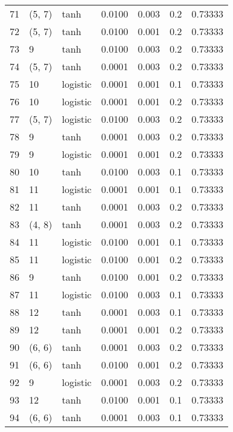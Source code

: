 \begin{tabular}{lllrrrr}
71  &      (5, 7) &      tanh &  0.0100 &  0.003 &  0.2 &   0.73333 \\
72  &      (5, 7) &      tanh &  0.0100 &  0.001 &  0.2 &   0.73333 \\
73  &           9 &      tanh &  0.0100 &  0.003 &  0.2 &   0.73333 \\
74  &      (5, 7) &      tanh &  0.0001 &  0.003 &  0.2 &   0.73333 \\
75  &          10 &  logistic &  0.0001 &  0.001 &  0.1 &   0.73333 \\
76  &          10 &  logistic &  0.0001 &  0.001 &  0.2 &   0.73333 \\
77  &      (5, 7) &  logistic &  0.0100 &  0.003 &  0.2 &   0.73333 \\
78  &           9 &      tanh &  0.0001 &  0.003 &  0.2 &   0.73333 \\
79  &           9 &  logistic &  0.0001 &  0.001 &  0.2 &   0.73333 \\
80  &          10 &      tanh &  0.0100 &  0.003 &  0.1 &   0.73333 \\
81  &          11 &  logistic &  0.0001 &  0.001 &  0.1 &   0.73333 \\
82  &          11 &      tanh &  0.0001 &  0.003 &  0.2 &   0.73333 \\
83  &      (4, 8) &      tanh &  0.0001 &  0.003 &  0.2 &   0.73333 \\
84  &          11 &  logistic &  0.0100 &  0.001 &  0.1 &   0.73333 \\
85  &          11 &  logistic &  0.0100 &  0.001 &  0.2 &   0.73333 \\
86  &           9 &      tanh &  0.0100 &  0.001 &  0.2 &   0.73333 \\
87  &          11 &  logistic &  0.0100 &  0.003 &  0.1 &   0.73333 \\
88  &          12 &      tanh &  0.0001 &  0.003 &  0.1 &   0.73333 \\
89  &          12 &      tanh &  0.0001 &  0.001 &  0.2 &   0.73333 \\
90  &      (6, 6) &      tanh &  0.0001 &  0.003 &  0.2 &   0.73333 \\
91  &      (6, 6) &      tanh &  0.0100 &  0.001 &  0.2 &   0.73333 \\
92  &           9 &  logistic &  0.0001 &  0.003 &  0.2 &   0.73333 \\
93  &          12 &      tanh &  0.0100 &  0.001 &  0.1 &   0.73333 \\
94  &      (6, 6) &      tanh &  0.0001 &  0.003 &  0.1 &   0.73333 \\

\end{tabular}
